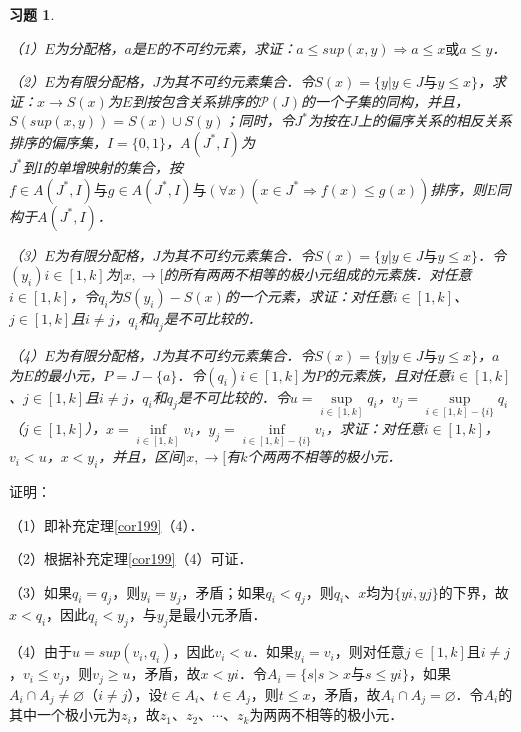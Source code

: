 \documentclass[12pt, a4paper, oneside]{book}
\newtheorem{exer}{习题}
\begin{document}
			\begin{exer}\label{exer134}
				\hfill\par
				（1）$E$为分配格，$a$是$E$的不可约元素，求证：$a\leq sup(x, y)\Rightarrow a\leq x\text{或}a\leq y$．
				\par
				（2）$E$为有限分配格，$J$为其不可约元素集合．令$S(x)=\{y|y\in J\text{与}y\leq x\}$，求证：$x\to S(x)$为$E$到按包含关系排序的$\mathcal{P}(J)$的一个子集的同构，并且，$S(sup(x, y))=S(x)\cup S(y)$；同时，令$J^*$为按在$J$上的偏序关系的相反关系排序的偏序集，$I=\{0, 1\}$，$A(J^*, I)$为\\$J^*$到$I$的单增映射的集合，按$f\in A(J^*, I)\text{与}g\in A(J^*, I)\text{与}(\forall x)(x\in J^*\Rightarrow f(x)\leq g(x))$排序，则$E$同构于$A(J^*, I)$．
				\par
				（3）$E$为有限分配格，$J$为其不可约元素集合．令$S(x)=\{y|y\in J\text{与}y\leq x\}$．令$(y_i)i\in [1, k]$为$]x, \to [$的所有两两不相等的极小元组成的元素族．对任意$i\in [1, k]$，令$q_i$为$S(y_i)-S(x)$的一个元素，求证：对任意$i\in [1, k]$、$j\in [1, k]$且$i\neq j$，$q_i$和$q_j$是不可比较的．
				\par
				（4）$E$为有限分配格，$J$为其不可约元素集合．令$S(x)=\{y|y\in J\text{与}y\leq x\}$，$a$为$E$的最小元，$P=J-\{a\}$．令$(q_i)i\in [1, k]$为$P$的元素族，且对任意$i\in [1, k]$、$j\in [1, k]$且$i\neq j$，$q_i$和$q_j$是不可比较的．令$u=\mathop{sup}\limits_{i\in [1, k]}q_i$，$v_j=\mathop{sup}\limits_{i\in [1, k]-\{i\}}q_i$（$j\in [1, k]$），$x=\mathop{inf}\limits_{i\in [1, k]}v_i$，$y_j=\mathop{inf}\limits_{i\in [1, k]-\{i\}}v_i$，求证：对任意$i\in [1, k]$，$v_i<u$，$x<y_i$，并且，区间$]x, \to [$有$k$个两两不相等的极小元．
			\end{exer}
			证明：
			\par
			（1）即补充定理\ref{cor199}（4）．
			\par
			（2）根据补充定理\ref{cor199}（4）可证．
			\par
			（3）如果$q_i=q_j$，则$y_i=y_j$，矛盾；如果$q_i<q_j$，则$q_i$、$x$均为$\{yi, yj\}$的下界，故$x<q_i$，因此$q_i<y_j$，与$y_j$是最小元矛盾．
			\par
			（4）由于$u=sup(v_i, q_i)$，因此$v_i<u$．如果$y_i=v_i$，则对任意$j\in [1, k]$且$i\neq j$，$v_i\leq v_j$，则$v_j\geq u$，矛盾，故$x<yi$．令$A_i=\{s|s>x\text{与}s\leq yi\}$，如果$A_i\cap A_j\neq \varnothing$（$i\neq j$），设$t\in A_i$、$t\in A_j$，则$t\leq x$，矛盾，故$A_i\cap A_j=\varnothing$．令$A_i$的其中一个极小元为$z_i$，故$z_1$、$z_2$、$\cdots$、$z_k$为两两不相等的极小元．
			
\end{document}

